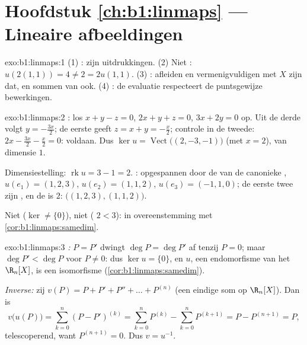\section*{Hoofdstuk \ref{ch:b1:linmaps} --- Lineaire afbeeldingen}

\begin{solution}{exo:b1:linmaps:1}
(1) :  zijn  uitdrukkingen. (2) Niet
: $u(2(1,1)) = 4 \neq 2 = 2u(1,1)$. (3) : afleiden en
vermenigvuldigen met $X$ zijn dat, en sommen van  ook. (4) : de evaluatie respecteert de
puntsgewijze bewerkingen.
\end{solution}

\begin{solution}{exo:b1:linmaps:2}
: los $x + y - z = 0$, $2x + y + z = 0$, $3x + 2y = 0$ op. Uit
de derde volgt $y = -\frac{3x}{2}$; de eerste geeft $z = x + y =
-\frac x2$; controle in de tweede: $2x - \frac{3x}{2} - \frac x2 =
0$: voldaan. Dus $\ker u = \operatorname{Vect}\bigl((2, -3,
-1)\bigr)$ (met $x = 2$), van dimensie $1$.

Dimensiestelling: $\operatorname{rk} u = 3 - 1 = 2$. :
opgespannen door de  van de canonieke , $u(e_1) =
(1,2,3)$, $u(e_2) = (1,1,2)$, $u(e_3) = (-1,1,0)$; de eerste twee
zijn , en de  is $2$:  $\bigl((1,2,3),
(1,1,2)\bigr)$.

Niet  ($\ker \neq \{0\}$), niet  ( $2 < 3$):
in overeenstemming met \cref{cor:b1:linmaps:samedim}.
\end{solution}

\begin{solution}{exo:b1:linmaps:3}
\emph{:} $P = P'$ dwingt $\deg P = \deg P'$ af tenzij $P = 0$;
maar $\deg P' < \deg P$ voor $P \neq 0$: dus $\ker u = \{0\}$, en
$u$, een  endomorfisme van het 
$\R_n[X]$, is een isomorfisme (\cref{cor:b1:linmaps:samedim}).

\emph{Inverse:} zij $v(P) = P + P' + P'' + \dots + P^{(n)}$ (een
eindige som op $\R_n[X]$). Dan is
\[
v\bigl(u(P)\bigr) = \sum_{k=0}^{n} (P - P')^{(k)}
= \sum_{k=0}^{n} P^{(k)} - \sum_{k=0}^{n} P^{(k+1)}
= P - P^{(n+1)} = P ,
\]
telescoperend, want $P^{(n+1)} = 0$. Dus $v = u^{-1}$.
\end{solution}

